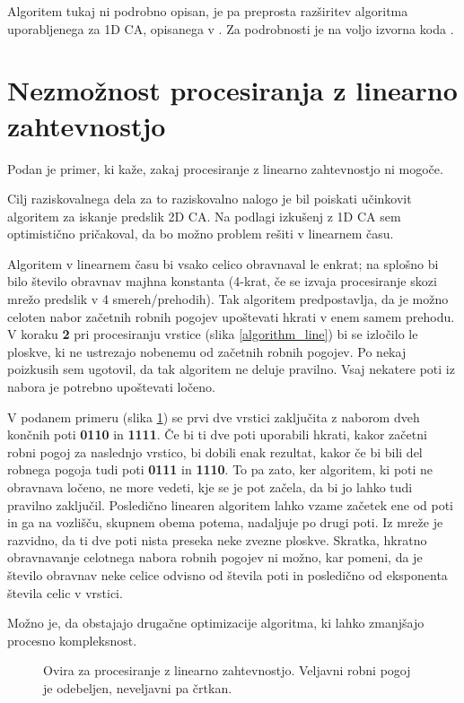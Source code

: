 \documentclass[12pt,a4paper,openany,twoside]{book}
\begin{document}
Algoritem tukaj ni podrobno opisan, je pa preprosta razširitev algoritma uporabljenega
za 1D CA, opisanega v \cite{JerasDobnikar2007}. Za podrobnosti je na voljo izvorna koda \cite{Jeras2016-algirithm}.

\section{Nezmožnost procesiranja z linearno zahtevnostjo}

Podan je primer, ki kaže, zakaj procesiranje z linearno zahtevnostjo ni mogoče.

Cilj raziskovalnega dela za to raziskovalno nalogo je bil poiskati
učinkovit algoritem za iskanje predslik 2D CA. Na podlagi izkušenj z 1D CA
sem optimistično pričakoval, da bo možno problem rešiti v linearnem času.

Algoritem v linearnem času bi vsako celico obravnaval le enkrat;
na splošno bi bilo število obravnav majhna konstanta (4-krat,
če se izvaja procesiranje skozi mrežo predslik v 4 smereh/prehodih).
Tak algoritem predpostavlja, da je možno celoten nabor začetnih
robnih pogojev upoštevati hkrati v enem samem prehodu.
V koraku \textbf{2} pri procesiranju vrstice (slika \ref{algorithm_line})
bi se izločilo le ploskve, ki ne ustrezajo nobenemu od začetnih robnih pogojev.
Po nekaj poizkusih sem ugotovil, da tak algoritem ne deluje pravilno.
Vsaj nekatere poti iz nabora je potrebno upoštevati ločeno.

V podanem primeru (slika \ref{algorithm_issue}) se prvi dve vrstici zaključita z
naborom dveh končnih poti \textbf{0110} in \textbf{1111}. Če bi ti dve poti
uporabili hkrati, kakor začetni robni pogoj za naslednjo vrstico, bi dobili
enak rezultat, kakor če bi bili del robnega pogoja tudi poti \textbf{0111} in \textbf{1110}.
To pa zato, ker algoritem, ki poti ne obravnava ločeno, ne more vedeti,
kje se je pot začela, da bi jo lahko tudi pravilno zaključil.
Posledično linearen algoritem lahko vzame začetek ene od poti in ga
na vozlišču, skupnem obema potema, nadaljuje po drugi poti.
Iz mreže je razvidno, da ti dve poti nista preseka neke zvezne ploskve.
Skratka, hkratno obravnavanje celotnega nabora robnih pogojev ni možno,
kar pomeni, da je število obravnav neke celice odvisno od števila poti
in posledično od eksponenta števila celic v vrstici.

Možno je, da obstajajo drugačne optimizacije algoritma, ki lahko zmanjšajo procesno kompleksnost.

\begin{figure}[htb]
\centerline{}
\caption[Ovira za procesiranje z linearno zahtevnostjo.]
{Ovira za procesiranje z linearno zahtevnostjo.
Veljavni robni pogoj je odebeljen, neveljavni pa črtkan.}
\label{algorithm_issue}
\end{figure}
\end{document}
